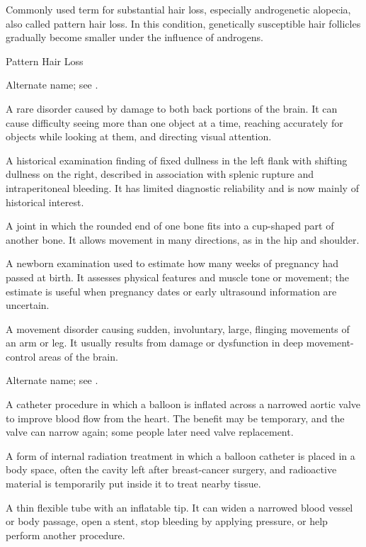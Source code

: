  Commonly used term for substantial hair loss, especially androgenetic alopecia, also called pattern
hair loss. In this condition, genetically susceptible hair follicles gradually become smaller under the influence of
androgens.

\synonyms
Pattern Hair Loss

 Alternate name; see .

 A rare disorder caused by damage to both back portions of the brain. It can cause difficulty seeing more than one object at a time, reaching accurately for objects while looking at them, and directing visual attention.

 A historical examination finding of fixed dullness in
the left flank with shifting dullness on the right, described in association
with splenic rupture and intraperitoneal bleeding. It has limited diagnostic
reliability and is now mainly of historical interest.

 A joint in which the rounded end of one bone fits into a cup-shaped part of another bone. It allows movement in many directions, as in the hip and shoulder.

 A newborn examination used to estimate how many weeks of pregnancy had passed at birth. It assesses physical features and muscle tone or movement; the estimate is useful when pregnancy dates or early ultrasound information are uncertain.

 A movement disorder causing sudden, involuntary, large, flinging movements of an arm or leg. It usually results from damage or dysfunction in deep movement-control areas of the brain.

 Alternate name; see .

 A catheter procedure in which a balloon is inflated across a narrowed aortic valve to improve blood flow from the heart. The benefit may be temporary, and the valve can narrow again; some people later need valve replacement.

 A form of internal radiation treatment in which a balloon catheter is placed in a body space, often the cavity left after breast-cancer surgery, and radioactive material is temporarily put inside it to treat nearby tissue.

 A thin flexible tube with an inflatable tip. It can widen a narrowed blood vessel or body passage, open a stent, stop bleeding by applying pressure, or help perform another procedure.


